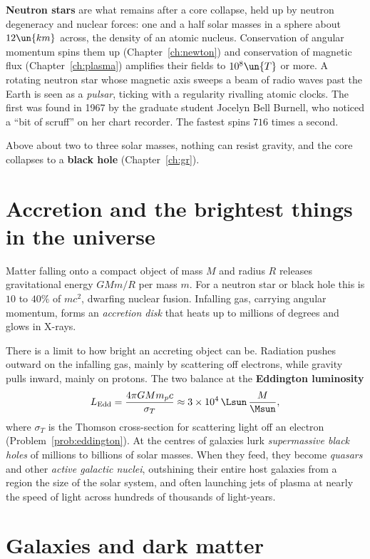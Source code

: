 \textbf{Neutron stars} are what remains after a core collapse, held up by neutron degeneracy and nuclear forces: one and a half solar masses in a sphere about $12\un{km}$ across, the density of an atomic nucleus. Conservation of angular momentum spins them up (Chapter~\ref{ch:newton}) and conservation of magnetic flux (Chapter~\ref{ch:plasma}) amplifies their fields to $10^8\un{T}$ or more. A rotating neutron star whose magnetic axis sweeps a beam of radio waves past the Earth is seen as a \emph{pulsar}, ticking with a regularity rivalling atomic clocks. The first was found in 1967 by the graduate student Jocelyn Bell Burnell, who noticed a ``bit of scruff'' on her chart recorder. The fastest spins $716$ times a second.

Above about two to three solar masses, nothing can resist gravity, and the core collapses to a \textbf{black hole} (Chapter~\ref{ch:gr}).

\section{Accretion and the brightest things in the universe}

Matter falling onto a compact object of mass $M$ and radius $R$ releases gravitational energy $GMm/R$ per mass $m$. For a neutron star or black hole this is $10$ to $40\%$ of $mc^2$, dwarfing nuclear fusion. Infalling gas, carrying angular momentum, forms an \emph{accretion disk} that heats up to millions of degrees and glows in X-rays.

There is a limit to how bright an accreting object can be. Radiation pushes outward on the infalling gas, mainly by scattering off electrons, while gravity pulls inward, mainly on protons. The two balance at the \textbf{Eddington luminosity}
\[
  L_{\text{Edd}} = \frac{4\pi GMm_pc}{\sigma_T}\approx3\times10^{4}\,\Lsun\,\frac{M}{\Msun},
\]
where $\sigma_T$ is the Thomson cross-section for scattering light off an electron (Problem~\ref{prob:eddington}). At the centres of galaxies lurk \emph{supermassive black holes} of millions to billions of solar masses. When they feed, they become \emph{quasars} and other \emph{active galactic nuclei}, outshining their entire host galaxies from a region the size of the solar system, and often launching jets of plasma at nearly the speed of light across hundreds of thousands of light-years.

\section{Galaxies and dark matter}


